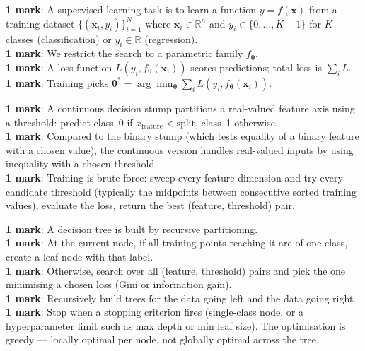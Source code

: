 \documentclass[11pt, a4paper]{article}
\begin{document}
\begin{exambox}
\textbf{1 mark}: A supervised learning task is to learn a function $y = f(\mathbf{x})$ from a training dataset $\{(\mathbf{x}_i, y_i)\}_{i=1}^N$ where $\mathbf{x}_i \in \mathbb{R}^n$ and $y_i \in \{0, \ldots, K-1\}$ for $K$ classes (classification) or $y_i \in \mathbb{R}$ (regression). \\
\textbf{1 mark}: We restrict the search to a parametric family $f_{\boldsymbol\theta}$. \\
\textbf{1 mark}: A loss function $L(y_i, f_{\boldsymbol\theta}(\mathbf{x}_i))$ scores predictions; total loss is $\sum_i L$. \\
\textbf{1 mark}: Training picks $\boldsymbol\theta^* = \arg\min_{\boldsymbol\theta} \sum_i L(y_i, f_{\boldsymbol\theta}(\mathbf{x}_i))$.
\end{exambox}

\begin{exambox}
\textbf{1 mark}: A continuous decision stump partitions a real-valued feature axis using a threshold: predict class~0 if $x_{\text{feature}} < \text{split}$, class~1 otherwise. \\
\textbf{1 mark}: Compared to the binary stump (which tests equality of a binary feature with a chosen value), the continuous version handles real-valued inputs by using inequality with a chosen threshold. \\
\textbf{1 mark}: Training is brute-force: sweep every feature dimension and try every candidate threshold (typically the midpoints between consecutive sorted training values), evaluate the loss, return the best (feature, threshold) pair.
\end{exambox}

\begin{exambox}
\textbf{1 mark}: A decision tree is built by recursive partitioning. \\
\textbf{1 mark}: At the current node, if all training points reaching it are of one class, create a leaf node with that label. \\
\textbf{1 mark}: Otherwise, search over all (feature, threshold) pairs and pick the one minimising a chosen loss (Gini or information gain). \\
\textbf{1 mark}: Recursively build trees for the data going left and the data going right. \\
\textbf{1 mark}: Stop when a stopping criterion fires (single-class node, or a hyperparameter limit such as max depth or min leaf size). The optimisation is greedy — locally optimal per node, not globally optimal across the tree.
\end{exambox}
\end{document}
